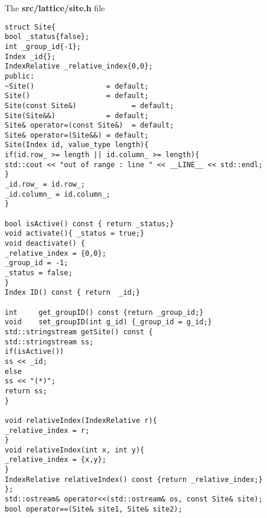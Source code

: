 
The \textbf{src/lattice/site.h} file

\begin{lstlisting}[style=CStyle]
struct Site{
bool _status{false};
int _group_id{-1};
Index _id{};
IndexRelative _relative_index{0,0};
public:
~Site()                 = default;
Site()                  = default;
Site(const Site&)             = default;
Site(Site&&)            = default;
Site& operator=(const Site&)  = default;
Site& operator=(Site&&) = default;
Site(Index id, value_type length){
if(id.row_ >= length || id.column_ >= length){
std::cout << "out of range : line " << __LINE__ << std::endl;
}
_id.row_ = id.row_;
_id.column_ = id.column_;
}

bool isActive() const { return _status;}
void activate(){ _status = true;}
void deactivate() {
_relative_index = {0,0};
_group_id = -1;
_status = false;
}
Index ID() const { return  _id;}

int     get_groupID() const {return _group_id;}
void    set_groupID(int g_id) {_group_id = g_id;}
std::stringstream getSite() const {
std::stringstream ss;
if(isActive())
ss << _id;
else
ss << "(*)";
return ss;
}

void relativeIndex(IndexRelative r){
_relative_index = r;
}
void relativeIndex(int x, int y){
_relative_index = {x,y};
}
IndexRelative relativeIndex() const {return _relative_index;}
};
std::ostream& operator<<(std::ostream& os, const Site& site);
bool operator==(Site& site1, Site& site2);
\end{lstlisting}
